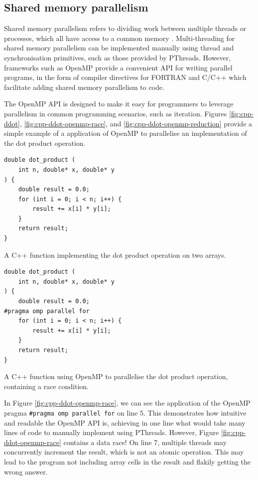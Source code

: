 \subsection{Shared memory parallelism}
\label{ssec:shared-memory-paralellism}

Shared memory parallelism refers to dividing work between multiple threads or processes, which all have access to a common memory  \cite{SharedMemoryParallelism}. Multi-threading for shared memory parallelism can be implemented manually using thread and synchronisation primitives, such as those provided by PThreads. However, frameworks such as OpenMP \cite{dagumOpenMPIndustryStandard1998} provide a convenient API for writing parallel programs, in the form of compiler directives for FORTRAN and C/C++ which facilitate adding shared memory parallelism to code.

The OpenMP API is designed to make it easy for programmers to leverage parallelism in common programming scenarios, such as iteration. Figures \ref{fig:cpp-ddot}, \ref{fig:cpp-ddot-openmp-race}, and \ref{fig:cpp-ddot-openmp-reduction} provide a simple example of a application of OpenMP to parallelise an implementation of the dot product operation.

\begin{listing}[H]
    \begin{verbatim}
double dot_product (
    int n, double* x, double* y
) {
    double result = 0.0;
    for (int i = 0; i < n; i++) {
        result += x[i] * y[i];
    }
    return result;
}
    \end{verbatim}
    \caption{A C++ function implementing the dot product operation on two arrays.}
    \label{fig:cpp-ddot}
\end{listing}

\begin{listing}[H]
    \begin{verbatim}
double dot_product (
    int n, double* x, double* y
) {
    double result = 0.0;
#pragma omp parallel for
    for (int i = 0; i < n; i++) {
        result += x[i] * y[i];
    }
    return result;
}
    \end{verbatim}
    \caption{A C++ function using OpenMP to parallelise the dot product operation, containing a race condition.}
    \label{fig:cpp-ddot-openmp-race}
\end{listing}

In Figure \ref{fig:cpp-ddot-openmp-race}, we can see the application of the OpenMP pragma \texttt{#pragma omp parallel for} on line 5. This demonstrates how intuitive and readable the OpenMP API is, achieving in one line what would take many lines of code to manually implement using PThreads. However, Figure \ref{fig:cpp-ddot-openmp-race} contains a data race! On line 7, multiple threads may concurrently increment the result, which is not an atomic operation. This may lead to the program not including array cells in the result and flakily getting the wrong answer.

